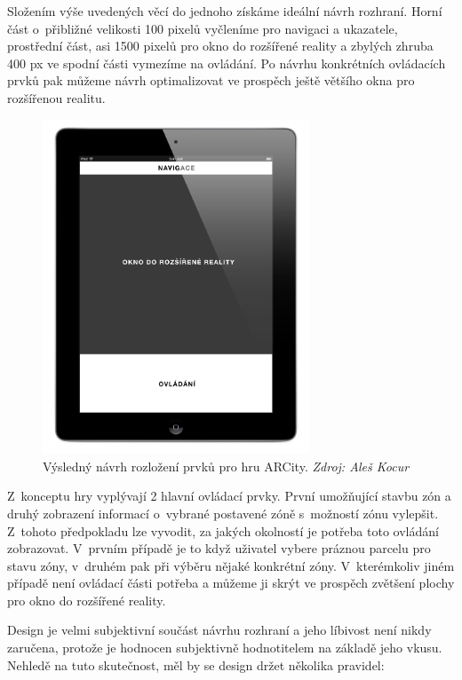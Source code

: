 \documentclass[twoside,12pt]{article}
\begin{document}
Složením výše uvedených věcí do jednoho získáme ideální návrh rozhraní. Horní část o~přibližné velikosti 100 pixelů vyčleníme pro navigaci a ukazatele, prostřední část, asi 1500 pixelů pro okno do rozšířené reality a zbylých zhruba 400 px ve spodní části vymezíme na ovládání. Po návrhu konkrétních ovládacích prvků pak můžeme návrh optimalizovat ve prospěch ještě většího okna pro rozšířenou realitu.

\begin{figure}[H]
\centering
    \includegraphics[width=300px, center]{images/ipad_layout_ux.jpg}
\captionsetup{justification=centering}
    \caption[]{Výsledný návrh rozložení prvků pro hru ARCity. \textit{Zdroj: Aleš Kocur}}
    \label{class_diagram}
\end{figure}

Z~konceptu hry vyplývají 2 hlavní ovládací prvky. První umožňující stavbu zón a druhý zobrazení informací o~vybrané postavené zóně s~možností zónu vylepšit. Z~tohoto předpokladu lze vyvodit, za jakých okolností je potřeba toto ovládání zobrazovat. V~prvním případě je to když uživatel vybere práznou parcelu pro stavu zóny, v~druhém pak při výběru nějaké konkrétní zóny. V~kterémkoliv jiném případě není ovládací části potřeba a můžeme ji skrýt ve prospěch zvětšení plochy pro okno do rozšířené reality.

\newpage


Design je velmi subjektivní součást návrhu rozhraní a jeho líbivost není nikdy zaručena, protože je hodnocen subjektivně hodnotitelem na základě jeho vkusu. Nehledě na tuto skutečnost, měl by se design držet několika pravidel:
\end{document}
